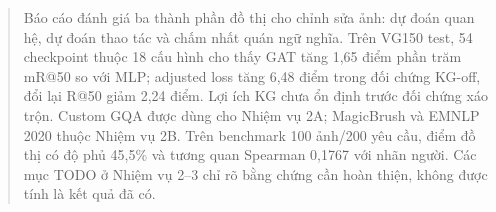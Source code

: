 \begin{abstract}
Báo cáo đánh giá ba thành phần đồ thị cho chỉnh sửa ảnh: dự đoán quan hệ,
dự đoán thao tác và chấm nhất quán ngữ nghĩa. Trên VG150 test, 54 checkpoint
thuộc 18 cấu hình cho thấy GAT tăng 1,65 điểm phần trăm mR@50 so với MLP;
adjusted loss tăng 6,48 điểm trong đối chứng KG-off, đổi lại R@50 giảm 2,24 điểm.
Lợi ích KG chưa ổn định trước đối chứng xáo trộn. Custom GQA được dùng cho
Nhiệm vụ 2A; MagicBrush và EMNLP 2020 thuộc Nhiệm vụ 2B. Trên benchmark
100 ảnh/200 yêu cầu, điểm đồ thị có độ phủ 45,5\% và tương quan Spearman
0,1767 với nhãn người. Các mục TODO ở Nhiệm vụ 2--3 chỉ rõ bằng chứng cần
hoàn thiện, không được tính là kết quả đã có.
\end{abstract}
